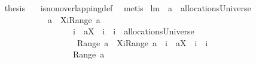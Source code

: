\begin{isabellebody}
\isanewline
{}\isamarkupfalse%
\ \isamarkupfalse%
\ {\isacharquery}thesis\ \isamarkupfalse%
\ {}\ is{\isacharunderscore}non{\isacharunderscore}overlapping{\isacharunderscore}def\ \isamarkupfalse%
\ metis\isanewline
{}\isamarkupfalse%
%
\endisatagproof
{\isafoldproof}%
%
\isadelimproof
\isanewline
%
\endisadelimproof
\isanewline
\isanewline
{}\isamarkupfalse%
\ lm{}{}{\isacharcolon}\ \ {\isachardoublequoteopen}a\ {\isasymin}\ allocationsUniverse{\isachardoublequoteclose}\ \isanewline
\ \ \ \ \ \ \ \ \ \ \ \ \ {\isachardoublequoteopen}{\isacharparenleft}a\ {\isacharminus}\ {\isacharparenleft}{\isacharparenleft}X{\isasymunion}{\isacharbraceleft}i{\isacharbraceright}{\isacharparenright}{\isasymtimes}{\isacharparenleft}Range\ a{\isacharparenright}{\isacharparenright}{\isacharparenright}\ {\isasymunion}\ \isanewline
\ \ \ \ \ \ \ \ \ \ \ \ \ \ \ \ \ \ \ {\isacharparenleft}{\isacharbraceleft}{\isacharparenleft}i{\isacharcomma}\ {\isasymUnion}\ {\isacharparenleft}a{\isacharbackquote}{\isacharbackquote}{\isacharparenleft}X\ {\isasymunion}\ {\isacharbraceleft}i{\isacharbraceright}{\isacharparenright}{\isacharparenright}{\isacharparenright}{\isacharbraceright}\ {\isacharminus}\ {\isacharbraceleft}{\isacharparenleft}i{\isacharcomma}{\isacharbraceleft}{\isacharbraceright}{\isacharparenright}{\isacharbraceright}{\isacharparenright}\ {\isasymin}\ allocationsUniverse\ {\isacharampersand}\ \isanewline
\ \ \ \ \ \ \ \ \ \ \ \ \ \ \ \ \ \ \ {\isasymUnion}\ {\isacharparenleft}Range\ {\isacharparenleft}{\isacharparenleft}a\ {\isacharminus}\ {\isacharparenleft}{\isacharparenleft}X{\isasymunion}{\isacharbraceleft}i{\isacharbraceright}{\isacharparenright}{\isasymtimes}{\isacharparenleft}Range\ a{\isacharparenright}{\isacharparenright}{\isacharparenright}\ {\isasymunion}\ {\isacharparenleft}{\isacharbraceleft}{\isacharparenleft}i{\isacharcomma}\ {\isasymUnion}\ {\isacharparenleft}a{\isacharbackquote}{\isacharbackquote}{\isacharparenleft}X\ {\isasymunion}\ {\isacharbraceleft}i{\isacharbraceright}{\isacharparenright}{\isacharparenright}{\isacharparenright}{\isacharbraceright}\ {\isacharminus}\ {\isacharbraceleft}{\isacharparenleft}i{\isacharcomma}{\isacharbraceleft}{\isacharbraceright}{\isacharparenright}{\isacharbraceright}{\isacharparenright}{\isacharparenright}{\isacharparenright}\ {\isacharequal}\isanewline
\ \ \ \ \ \ \ \ \ \ \ \ \ \ \ \ \ \ \ {\isasymUnion}{\isacharparenleft}Range\ a{\isacharparenright}{\isachardoublequoteclose}\isanewline

\end{isabellebody}
